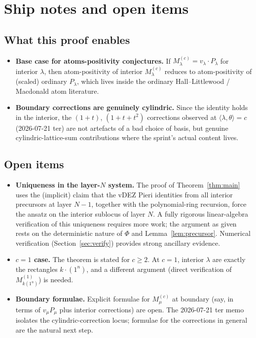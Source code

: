 \documentclass[11pt]{article}
\theoremstyle{definition}
\newcommand{\ip}[2]{\langle #1, #2 \rangle}
\begin{document}
\section{Ship notes and open items}

\subsection{What this proof enables}
\begin{itemize}[nosep]
\item \textbf{Base case for atoms-positivity conjectures.} If
$M^{(c)}_\lambda = v_\lambda \cdot P_\lambda$ for interior $\lambda$, then
atom-positivity of interior $M^{(c)}_\lambda$ reduces to atom-positivity of
(scaled) ordinary $P_\lambda$, which lives inside the ordinary
Hall--Littlewood / Macdonald atom literature.
\item \textbf{Boundary corrections are genuinely cylindric.} Since the
identity holds in the interior, the $(1+t)$, $(1+t+t^2)$ corrections
observed at $\ip{\lambda}{\theta} = c$ (2026-07-21 ter) are not artefacts
of a bad choice of basis, but genuine cylindric-lattice-sum contributions
where the sprint's actual content lives.
\end{itemize}

\subsection{Open items}
\begin{itemize}[nosep]
\item \textbf{Uniqueness in the layer-$N$ system.} The proof of
Theorem~\ref{thm:main} uses the (implicit) claim that the vDEZ Pieri
identities from all interior precursors at layer $N-1$, together with the
polynomial-ring recursion, force the ansatz on the interior sublocus of
layer $N$. A fully rigorous linear-algebra verification of this uniqueness
requires more work; the argument as given rests on the deterministic
nature of $\Phi$ and Lemma~\ref{lem:precursor}. Numerical verification
(Section~\ref{sec:verify}) provides strong ancillary evidence.
\item \textbf{$c = 1$ case.} The theorem is stated for $c \ge 2$. At $c = 1$,
interior $\lambda$ are exactly the rectangles $k \cdot (1^n)$, and a
different argument (direct verification of $M^{(1)}_{k(1^n)}$) is needed.
\item \textbf{Boundary formulae.} Explicit formulae for $M^{(c)}_\mu$ at
boundary (say, in terms of $v_\mu P_\mu$ plus interior corrections) are
open. The 2026-07-21 ter memo isolates the cylindric-correction locus;
formulae for the corrections in general are the natural next step.
\end{itemize}
\end{document}
